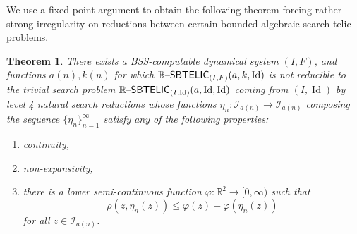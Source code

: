 \documentclass{amsart}
\theoremstyle{theorem}
\newtheorem{theorem}{Theorem}[section]
\theoremstyle{remark}
\DeclareMathOperator{\Id}{Id}
\newcommand{\RR}{\mathbb{R}}
\newcommand{\ccRSBTELIC}{\mathbb{R}\textsf{\upshape --SBTELIC}}
\newcommand{\cI}{\mathcal{I}}
\begin{document}
We use a fixed point argument to obtain the following theorem forcing rather strong irregularity on reductions between certain bounded algebraic search telic problems.

\begin{theorem}\label{thm:fixedPoint}
There exists a BSS-computable dynamical system $(I, F)$, and functions $a(n), k(n)$ for which $\ccRSBTELIC_{(I, F)}(a, k,\Id)$ is not reducible to the trivial search problem  $\ccRSBTELIC_{(I, \Id)}(a, \Id,\Id)$ coming from $(I, \Id)$ by level 4 natural search reductions whose functions $\eta_n:\cI_{a(n)}\rightarrow \cI_{a(n)}$ composing the sequence $\{\eta_n\}_{n=1}^\infty$ satisfy any of the following properties:
\begin{enumerate}
\item continuity,
\item non-expansivity,
\item there is a lower semi-continuous function $\varphi:\RR^2\rightarrow [0,\infty)$ such that
\[
\rho(z, \eta_n(z))\leq \varphi(z)-\varphi(\eta_n(z))
\]
for all $z \in \cI_{a(n)}$.
\end{enumerate}
\end{theorem}
\end{document}

